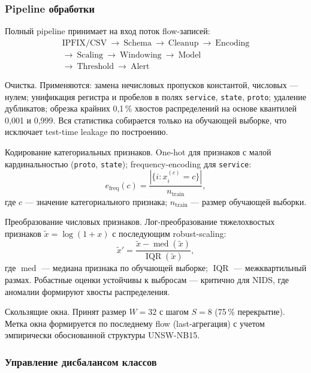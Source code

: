 \subsubsection{Pipeline обработки}

Полный pipeline принимает на вход поток flow-записей:
\[
\boxed{
\begin{array}{l}
\text{IPFIX/CSV}\ \to\ \text{Schema}\ \to\ \text{Cleanup}\ \to\ \text{Encoding}\\[2pt]
\to\ \text{Scaling}\ \to\ \text{Windowing}\ \to\ \text{Model}\\[2pt]
\to\ \text{Threshold}\ \to\ \text{Alert}
\end{array}
}
\]

Очистка. Применяются: замена нечисловых пропусков константой,
числовых --- нулем; унификация регистра и пробелов в полях
\texttt{service}, \texttt{state}, \texttt{proto}; удаление
дубликатов; обрезка крайних 0{,}1\,\% хвостов распределений на
основе квантилей 0,001 и 0,999. Вся статистика собирается только
на обучающей выборке, что исключает test-time leakage по
построению.

Кодирование категориальных признаков. One-hot для признаков с
малой кардинальностью (\texttt{proto}, \texttt{state});
frequency-encoding для \texttt{service}:
\begin{equation}
e_{\text{freq}}(c) = \frac{|\{i : x_i^{(c)} = c\}|}{n_{\text{train}}},
\label{eq:freq-enc}
\end{equation}
где \(c\) --- значение категориального признака;
\(n_{\text{train}}\) --- размер обучающей выборки.

Преобразование числовых признаков. Лог-преобразование
тяжелохвостых признаков \(\tilde{x} = \log(1 + x)\) с последующим
robust-scaling:
\begin{equation}
\tilde{x}' = \frac{\tilde{x} - \operatorname{med}(\tilde{x})}
                  {\operatorname{IQR}(\tilde{x})},
\label{eq:robust-scaler}
\end{equation}
где \(\operatorname{med}\) --- медиана признака по обучающей
выборке; \(\operatorname{IQR}\) --- межквартильный размах.
Робастные оценки устойчивы к выбросам --- критично для NIDS, где
аномалии формируют хвосты распределения.

Скользящие окна. Принят размер \(W = 32\) с шагом \(S = 8\)
(75\,\% перекрытие). Метка окна формируется по последнему flow
(last-агрегация) с учетом эмпирически обоснованной структуры
UNSW-NB15.

\subsubsection{Управление дисбалансом классов}

